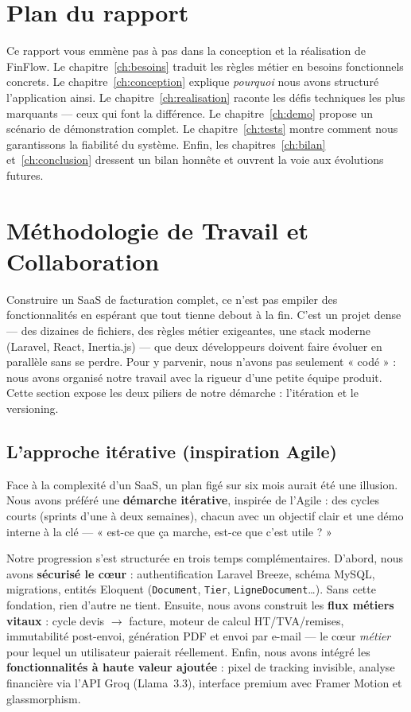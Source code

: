 \documentclass[12pt,a4paper]{report}
\begin{document}
\section{Plan du rapport}

Ce rapport vous emmène pas à pas dans la conception et la réalisation de FinFlow. Le chapitre~\ref{ch:besoins} traduit les règles métier en besoins fonctionnels concrets. Le chapitre~\ref{ch:conception} explique \emph{pourquoi} nous avons structuré l'application ainsi. Le chapitre~\ref{ch:realisation} raconte les défis techniques les plus marquants --- ceux qui font la différence. Le chapitre~\ref{ch:demo} propose un scénario de démonstration complet. Le chapitre~\ref{ch:tests} montre comment nous garantissons la fiabilité du système. Enfin, les chapitres~\ref{ch:bilan} et~\ref{ch:conclusion} dressent un bilan honnête et ouvrent la voie aux évolutions futures.

\section{Méthodologie de Travail et Collaboration}

Construire un SaaS de facturation complet, ce n'est pas empiler des fonctionnalités en espérant que tout tienne debout à la fin. C'est un projet dense --- des dizaines de fichiers, des règles métier exigeantes, une stack moderne (Laravel, React, Inertia.js) --- que deux développeurs doivent faire évoluer en parallèle sans se perdre. Pour y parvenir, nous n'avons pas seulement « codé » : nous avons organisé notre travail avec la rigueur d'une petite équipe produit. Cette section expose les deux piliers de notre démarche : l'itération et le versioning.

\subsection{L'approche itérative (inspiration Agile)}

Face à la complexité d'un SaaS, un plan figé sur six mois aurait été une illusion. Nous avons préféré une \textbf{démarche itérative}, inspirée de l'Agile : des cycles courts (sprints d'une à deux semaines), chacun avec un objectif clair et une démo interne à la clé --- « est-ce que ça marche, est-ce que c'est utile ? »

Notre progression s'est structurée en trois temps complémentaires. D'abord, nous avons \textbf{sécurisé le cœur} : authentification Laravel Breeze, schéma MySQL, migrations, entités Eloquent (\texttt{Document}, \texttt{Tier}, \texttt{LigneDocument}\ldots). Sans cette fondation, rien d'autre ne tient. Ensuite, nous avons construit les \textbf{flux métiers vitaux} : cycle devis $\rightarrow$ facture, moteur de calcul HT/TVA/remises, immutabilité post-envoi, génération PDF et envoi par e-mail --- le cœur \emph{métier} pour lequel un utilisateur paierait réellement. Enfin, nous avons intégré les \textbf{fonctionnalités à haute valeur ajoutée} : pixel de tracking invisible, analyse financière via l'API Groq (Llama~3.3), interface premium avec Framer Motion et glassmorphism.
\end{document}
